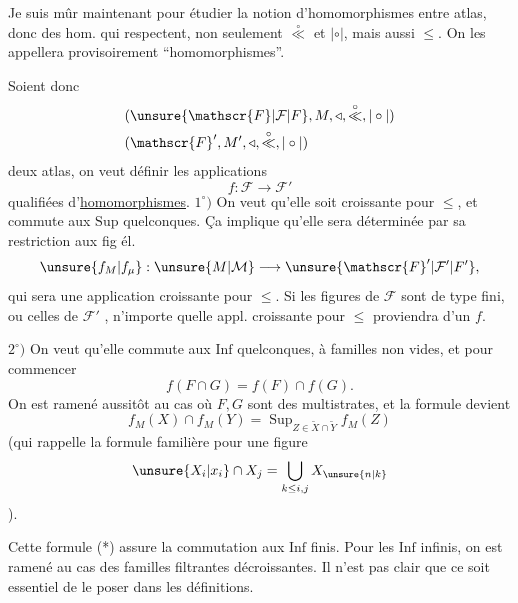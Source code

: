 
Je suis mûr maintenant pour étudier la notion d'homomorphismes  entre atlas, donc des hom. qui respectent, non seulement $\overset{\circ}{\ll}$ et $\mathrel{|\circ|}$, mais aussi $\leq$. On les appellera provisoirement ``homomorphismes''.


Soient donc
\[
\begin{aligned}
&(\unsure{\mathscr{F}|\mathcal{F}|F},M,\triangleleft,\overset{\circ}{\ll},\mathrel{|\circ|})\\
&(\mathscr{F}',M',\triangleleft,\overset{\circ}{\ll},\mathrel{|\circ|})
\end{aligned}
\]
deux atlas, on veut définir les applications
\[
f:\mathscr{F}\longrightarrow\mathscr{F}'
\]
qualifiées d'\uline{homomorphismes}.
$1^\circ)$ On veut qu'elle soit croissante pour $\leq$, et commute aux $\mathrm{Sup}$ quelconques. Ça implique qu'elle sera déterminée par sa restriction aux fig él.
\[
\unsure{f_M|f_\mu}:\unsure{M|\mathcal{M}}\longrightarrow\unsure{\mathscr{F}'|\mathcal{F}'|F'},
\]
qui sera une application croissante pour $\leq$. Si les figures de $\mathscr{F}$ sont de type fini, ou celles de $\mathscr{F}'$ , n'importe quelle appl.  croissante pour $\leq$ proviendra d'un $f$.

$2^\circ)$ On veut qu'elle commute aux $\mathrm{Inf}$ quelconques, à familles  non vides, et pour commencer
\[
f(F\cap G)=f(F)\cap f(G).\tag*{(*)}
\]
On est ramené aussitôt au cas où $F,G$ sont des multistrates, et la formule devient
\[
f_M(X)\cap f_M(Y)=\mathop{\mathrm{Sup}}_{Z\in\widetilde{X}\cap\widetilde{Y}}f_M(Z)\tag*{$(*_M)$}
\]
(qui rappelle la formule familière pour une figure 
\[
\unsure{X_i|x_i}\cap X_j=\bigcup_{k\leq i,j}X_{\unsure{n|k}}
\]
).

Cette formule (*) assure la commutation aux $\mathrm{Inf}$ finis. Pour les $\mathrm{Inf}$ infinis, on est ramené au cas des familles  filtrantes décroissantes. Il n'est
pas clair que ce soit essentiel de le poser dans les définitions.

